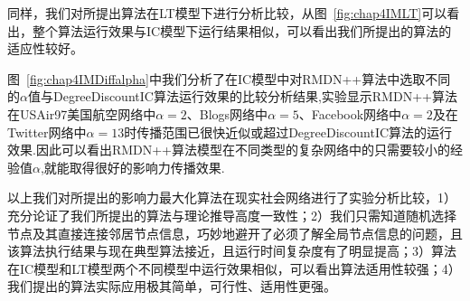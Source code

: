 同样，我们对所提出算法在LT模型下进行分析比较，从图~\ref{fig:chap4IMLT}可以看出，整个算法运行效果与IC模型下运行结果相似，可以看出我们所提出的算法的适应性较好。


图~\ref{fig:chap4IMDiffalpha}中我们分析了在IC模型中对RMDN++算法中选取不同的$\alpha$值与DegreeDiscountIC算法运行效果的比较分析结果,实验显示RMDN++算法在USAir97美国航空网络中$\alpha =2$、Blogs网络中$\alpha =5$、Facebook网络中$\alpha =2$及在Twitter网络中$\alpha =13$时传播范围已很快近似或超过DegreeDiscountIC算法的运行效果.因此可以看出RMDN++算法模型在不同类型的复杂网络中的只需要较小的经验值$\alpha$,就能取得很好的影响力传播效果.

以上我们对所提出的影响力最大化算法在现实社会网络进行了实验分析比较，1）充分论证了我们所提出的算法与理论推导高度一致性；2）我们只需知道随机选择节点及其直接连接邻居节点信息，巧妙地避开了必须了解全局节点信息的问题，且该算法执行结果与现在典型算法接近，且运行时间复杂度有了明显提高；3）算法在IC模型和LT模型两个不同模型中运行效果相似，可以看出算法适用性较强；4）我们提出的算法实际应用极其简单，可行性、适用性更强。

